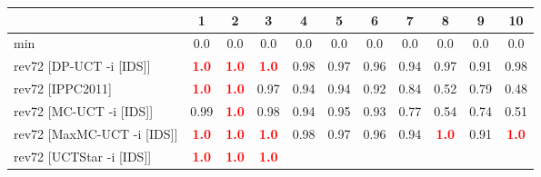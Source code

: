 \documentclass{article}
\begin{document}
\begin{tabular}{|l|r@{$\pm$}rr@{$\pm$}rr@{$\pm$}rr@{$\pm$}rr@{$\pm$}rr@{$\pm$}rr@{$\pm$}rr@{$\pm$}rr@{$\pm$}rr@{$\pm$}r|}
\hline

& \multicolumn{2}{c}{1}
& \multicolumn{2}{c}{2}
& \multicolumn{2}{c}{3}
& \multicolumn{2}{c}{4}
& \multicolumn{2}{c}{5}
& \multicolumn{2}{c}{6}
& \multicolumn{2}{c}{7}
& \multicolumn{2}{c}{8}
& \multicolumn{2}{c}{9}
& \multicolumn{2}{c|}{10}
\\
\hline
\hline
min
& \multicolumn{2}{c}{0.0}
& \multicolumn{2}{c}{0.0}
& \multicolumn{2}{c}{0.0}
& \multicolumn{2}{c}{0.0}
& \multicolumn{2}{c}{0.0}
& \multicolumn{2}{c}{0.0}
& \multicolumn{2}{c}{0.0}
& \multicolumn{2}{c}{0.0}
& \multicolumn{2}{c}{0.0}
& \multicolumn{2}{c|}{0.0}
\\
rev72 [DP-UCT -i [IDS]]
& \multicolumn{2}{c}{\textbf{\textcolor{red}{1.0}}}
& \multicolumn{2}{c}{\textbf{\textcolor{red}{1.0}}}
& \multicolumn{2}{c}{\textbf{\textcolor{red}{1.0}}}
& \multicolumn{2}{c}{0.98}
& \multicolumn{2}{c}{0.97}
& \multicolumn{2}{c}{0.96}
& \multicolumn{2}{c}{0.94}
& \multicolumn{2}{c}{0.97}
& \multicolumn{2}{c}{0.91}
& \multicolumn{2}{c|}{0.98}
\\
rev72 [IPPC2011]
& \multicolumn{2}{c}{\textbf{\textcolor{red}{1.0}}}
& \multicolumn{2}{c}{\textbf{\textcolor{red}{1.0}}}
& \multicolumn{2}{c}{0.97}
& \multicolumn{2}{c}{0.94}
& \multicolumn{2}{c}{0.94}
& \multicolumn{2}{c}{0.92}
& \multicolumn{2}{c}{0.84}
& \multicolumn{2}{c}{0.52}
& \multicolumn{2}{c}{0.79}
& \multicolumn{2}{c|}{0.48}
\\
rev72 [MC-UCT -i [IDS]]
& \multicolumn{2}{c}{0.99}
& \multicolumn{2}{c}{\textbf{\textcolor{red}{1.0}}}
& \multicolumn{2}{c}{0.98}
& \multicolumn{2}{c}{0.94}
& \multicolumn{2}{c}{0.95}
& \multicolumn{2}{c}{0.93}
& \multicolumn{2}{c}{0.77}
& \multicolumn{2}{c}{0.54}
& \multicolumn{2}{c}{0.74}
& \multicolumn{2}{c|}{0.51}
\\
rev72 [MaxMC-UCT -i [IDS]]
& \multicolumn{2}{c}{\textbf{\textcolor{red}{1.0}}}
& \multicolumn{2}{c}{\textbf{\textcolor{red}{1.0}}}
& \multicolumn{2}{c}{\textbf{\textcolor{red}{1.0}}}
& \multicolumn{2}{c}{0.98}
& \multicolumn{2}{c}{0.97}
& \multicolumn{2}{c}{0.96}
& \multicolumn{2}{c}{0.94}
& \multicolumn{2}{c}{\textbf{\textcolor{red}{1.0}}}
& \multicolumn{2}{c}{0.91}
& \multicolumn{2}{c|}{\textbf{\textcolor{red}{1.0}}}
\\
rev72 [UCTStar -i [IDS]]
& \multicolumn{2}{c}{\textbf{\textcolor{red}{1.0}}}
& \multicolumn{2}{c}{\textbf{\textcolor{red}{1.0}}}
& \multicolumn{2}{c}{\textbf{\textcolor{red}{1.0}}}

\end{tabular}
\end{document}
